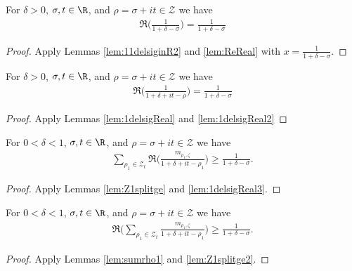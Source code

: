 \begin{lemma}\label{lem:1delsigReal2}  \leanok
For $\delta>0$, $\sigma, t\in\R$, and $\rho=\sigma+it\in \mathcal Z$ we have
\begin{align*}
\Re\Big(\frac{1}{1 + \delta -\sigma}\Big) = \frac{1}{1 + \delta -\sigma}
\end{align*}
\end{lemma}
\begin{proof} \leanok
Apply Lemmas \ref{lem:11delsiginR2} and \ref{lem:ReReal} with $x=\frac{1}{1 + \delta -\sigma}$.
\end{proof}

\begin{lemma}\label{lem:1delsigReal3}  \leanok
For $\delta>0$, $\sigma, t\in\R$, and $\rho=\sigma+it\in \mathcal Z$ we have
\begin{align*}
\Re\Big(\frac{1}{1+\delta+it-\rho}\Big) = \frac{1}{1 + \delta -\sigma}
\end{align*}
\end{lemma}
\begin{proof} 
Apply Lemmas \ref{lem:1delsigReal} and \ref{lem:1delsigReal2} \leanok
\end{proof}

\begin{lemma}\label{lem:Z1splitge2}  \leanok
For $0<\delta<1$, $\sigma, t\in\R$, and $\rho=\sigma+it\in \mathcal Z$ we have
\begin{align*}
\sum_{\rho_1\in \mathcal Z_t} \Re\Big(\frac{m_{\rho_1,\zeta}}{1+\delta+it-\rho_1}\Big) \ge \frac{1}{1 + \delta -\sigma}.
\end{align*}
\end{lemma}
\begin{proof} \leanok {}
Apply Lemmas \ref{lem:Z1splitge} and \ref{lem:1delsigReal3}.
\end{proof}

\begin{lemma}\label{lem:Z1splitge3}  \leanok
For $0<\delta<1$, $\sigma, t\in\R$, and $\rho=\sigma+it\in \mathcal Z$ we have
\begin{align*}
\Re\Big(\sum_{\rho_1\in \mathcal Z_t} \frac{m_{\rho_1,\zeta}}{1+\delta+it-\rho_1}\Big) \ge \frac{1}{1 + \delta -\sigma}.
\end{align*}
\end{lemma}
\begin{proof}  \leanok
Apply Lemmas \ref{lem:sumrho1} and \ref{lem:Z1splitge2}.
\end{proof}

